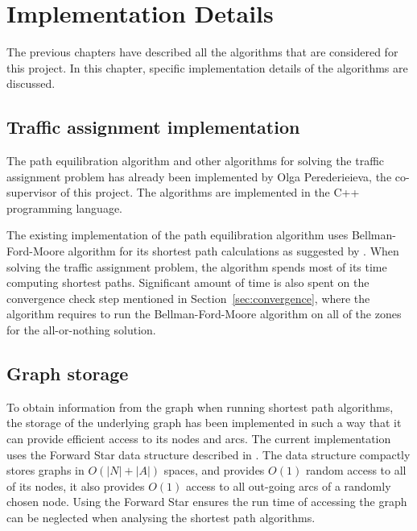 \chapter{Implementation Details} \label{chap:implementation}
The previous chapters have described all the algorithms that are considered for this project.
In this chapter, specific implementation details of the algorithms are discussed.

\section{Traffic assignment implementation}
The path equilibration algorithm and other algorithms for solving the traffic assignment problem has already been implemented by Olga Perederieieva, the co-supervisor of this project.
The algorithms are implemented in the C++ programming language.

The existing implementation of the path equilibration algorithm uses Bellman-Ford-Moore algorithm for its shortest path calculations as suggested by \citet{Sheffi}.
When solving the traffic assignment problem,
the algorithm spends most of its time computing shortest paths.
Significant amount of time is also spent on the convergence check step mentioned in Section~\ref{sec:convergence},
where the algorithm requires to run the Bellman-Ford-Moore algorithm on all of the zones for the all-or-nothing solution.

\section{Graph storage}
To obtain information from the graph when running shortest path algorithms,
the storage of the underlying graph has been implemented in such a way that it can provide efficient access to its nodes and arcs.
The current implementation uses the Forward Star data structure described in \citet{Sheffi}.
The data structure compactly stores graphs in $O(|N|+|A|)$ spaces,
and provides $O(1)$ random access to all of its nodes,
it also provides $O(1)$ access to all out-going arcs of a randomly chosen node.
Using the Forward Star ensures the run time of accessing the graph can be neglected when analysing the shortest path algorithms.

